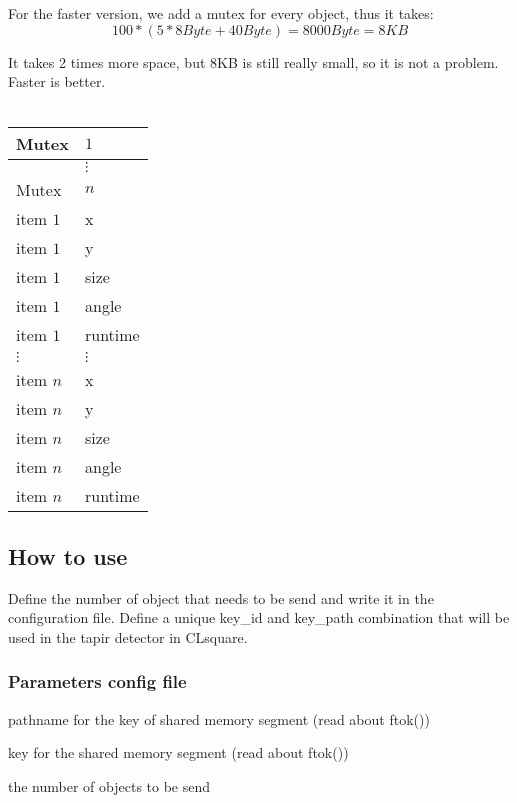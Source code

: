 For the faster version, we add a mutex for every object, thus it takes:
\begin{displaymath}
                        100 * (5*8Byte +40Byte) = 8000Byte = 8KB
\end{displaymath}

It takes 2 times more space, but 8KB is still really small, so it is 
not a problem. Faster is better.
\\
\\
\begin{center}
\begin{tabular}{l|l}
    Mutex    & $1$ \\ \hline
             & $\vdots$ \\ \hline  
    Mutex    & $n$ \\ \hline
    item $1$ & x \\ \hline
    item $1$ & y \\ \hline
    item $1$ & size \\ \hline 
    item $1$ & angle \\ \hline
    item $1$ & runtime \\ \hline
    $\vdots$ & $\vdots$ \\ \hline
    item $n$ & x \\ \hline
    item $n$ & y \\ \hline
    item $n$ & size \\ \hline 
    item $n$ & angle \\ \hline
    item $n$ & runtime
\end{tabular}
\end{center}

\subsection{How to use}

Define the number of object that needs to be send and write it in the 
configuration file. Define a unique key\_id and key\_path combination 
that will be used in the tapir detector in CLsquare.

\subsubsection{Parameters config file}

    \begin{description} \itemindent=-15pt
        \item[key\_path] pathname for the key of shared memory segment 
                (read about ftok())
        \item[key\_id] key for the shared memory segment (read about ftok())
        \item[nb\_objects] the number of objects to be send
    \end{description}
